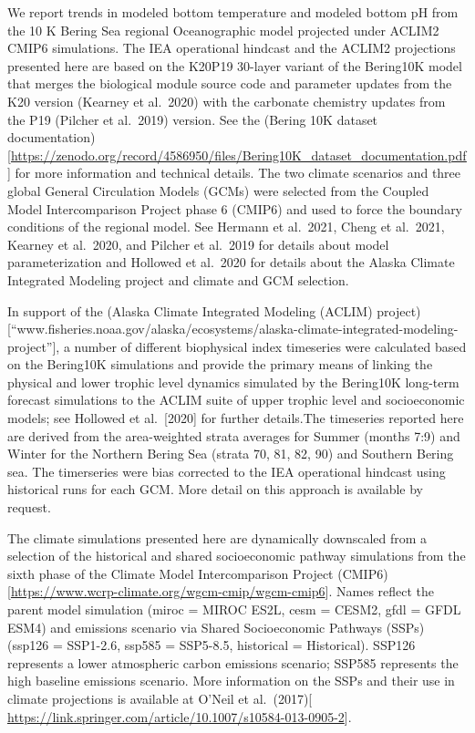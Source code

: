 \documentclass[
]{article}
\begin{document}
We report trends in modeled bottom temperature and modeled bottom pH
from the 10 K Bering Sea regional Oceanographic model projected under
ACLIM2 CMIP6 simulations. The IEA operational hindcast and the ACLIM2
projections presented here are based on the K20P19 30-layer variant of
the Bering10K model that merges the biological module source code and
parameter updates from the K20 version (Kearney et al.~2020) with the
carbonate chemistry updates from the P19 (Pilcher et al.~2019) version.
See the (Bering 10K dataset
documentation){[}\url{https://zenodo.org/record/4586950/files/Bering10K_dataset_documentation.pdf}{]}
for more information and technical details. The two climate scenarios
and three global General Circulation Models (GCMs) were selected from
the Coupled Model Intercomparison Project phase 6 (CMIP6) and used to
force the boundary conditions of the regional model. See Hermann et
al.~2021, Cheng et al.~2021, Kearney et al.~2020, and Pilcher et
al.~2019 for details about model parameterization and Hollowed et
al.~2020 for details about the Alaska Climate Integrated Modeling
project and climate and GCM selection.

In support of the (Alaska Climate Integrated Modeling (ACLIM)
project){[}``www.fisheries.noaa.gov/alaska/ecosystems/alaska-climate-integrated-modeling-project''{]},
a number of different biophysical index timeseries were calculated based
on the Bering10K simulations and provide the primary means of linking
the physical and lower trophic level dynamics simulated by the Bering10K
long-term forecast simulations to the ACLIM suite of upper trophic level
and socioeconomic models; see Hollowed et al.~{[}2020{]} for further
details.The timeseries reported here are derived from the area-weighted
strata averages for Summer (months 7:9) and Winter for the Northern
Bering Sea (strata 70, 81, 82, 90) and Southern Bering sea. The
timerseries were bias corrected to the IEA operational hindcast using
historical runs for each GCM. More detail on this approach is available
by request.

The climate simulations presented here are dynamically downscaled from a
selection of the historical and shared socioeconomic pathway simulations
from the sixth phase of the Climate Model Intercomparison Project
(CMIP6){[}\url{https://www.wcrp-climate.org/wgcm-cmip/wgcm-cmip6}{]}.
Names reflect the parent model simulation (miroc = MIROC ES2L, cesm =
CESM2, gfdl = GFDL ESM4) and emissions scenario via Shared Socioeconomic
Pathways (SSPs) (ssp126 = SSP1-2.6, ssp585 = SSP5-8.5, historical =
Historical). SSP126 represents a lower atmospheric carbon emissions
scenario; SSP585 represents the high baseline emissions scenario. More
information on the SSPs and their use in climate projections is
available at O'Neil et al.~(2017){[}
\url{https://link.springer.com/article/10.1007/s10584-013-0905-2}{]}.
\end{document}
